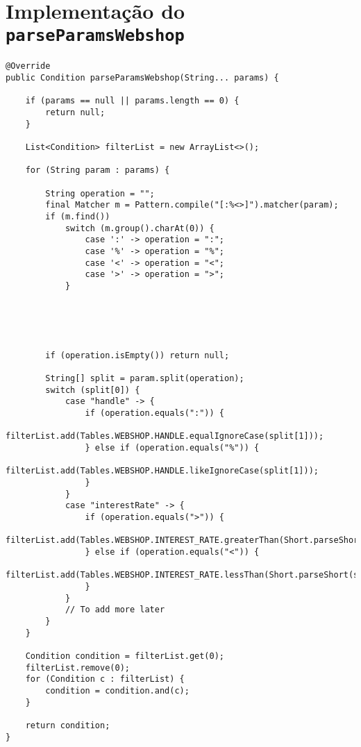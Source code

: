 \chapter{Implementação do \texttt{parseParamsWebshop}}\label{an1}

\begin{lstlisting}[frame=bt,numbers=none]
@Override
public Condition parseParamsWebshop(String... params) {

	if (params == null || params.length == 0) {
		return null;
	}

	List<Condition> filterList = new ArrayList<>();

	for (String param : params) {

		String operation = "";
		final Matcher m = Pattern.compile("[:%<>]").matcher(param);
		if (m.find())
			switch (m.group().charAt(0)) {
				case ':' -> operation = ":";
				case '%' -> operation = "%";
				case '<' -> operation = "<";
				case '>' -> operation = ">";
			}




			
		if (operation.isEmpty()) return null;

		String[] split = param.split(operation);
		switch (split[0]) {
			case "handle" -> {
				if (operation.equals(":")) {
					filterList.add(Tables.WEBSHOP.HANDLE.equalIgnoreCase(split[1]));
				} else if (operation.equals("%")) {
					filterList.add(Tables.WEBSHOP.HANDLE.likeIgnoreCase(split[1]));
				}
			}
			case "interestRate" -> {
				if (operation.equals(">")) {
					filterList.add(Tables.WEBSHOP.INTEREST_RATE.greaterThan(Short.parseShort(split[1])));
				} else if (operation.equals("<")) {
					filterList.add(Tables.WEBSHOP.INTEREST_RATE.lessThan(Short.parseShort(split[1])));
				}
			}
			// To add more later
		}
	}

	Condition condition = filterList.get(0);
	filterList.remove(0);
	for (Condition c : filterList) {
		condition = condition.and(c);
	}

	return condition;
}
\end{lstlisting}